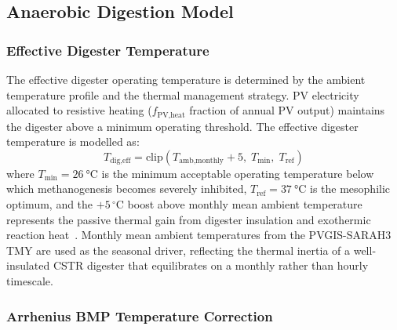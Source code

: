 \subsection{Anaerobic Digestion Model}
\label{sec:admodel}

\subsubsection{Effective Digester Temperature}

\hspace{1cm}The effective digester operating temperature is determined
by the ambient temperature profile and the thermal management strategy.
PV electricity allocated to resistive heating ($f_{\text{PV,heat}}$
fraction of annual PV output) maintains the digester above a minimum
operating threshold. The effective digester temperature is modelled as:
\begin{equation}
	T_{\text{dig,eff}} = \mathrm{clip}
	\!\left(T_{\text{amb,monthly}} + 5,\;
	T_{\text{min}},\; T_{\text{ref}}\right)
	\label{eq:tdig}
\end{equation}
where $T_{\text{min}} = \SI{26}{\celsius}$ is the minimum acceptable
operating temperature below which methanogenesis becomes severely
inhibited, $T_{\text{ref}} = \SI{37}{\celsius}$ is the mesophilic
optimum, and the $+5\,^{\circ}$C boost above monthly mean ambient
temperature represents the passive thermal gain from digester
insulation and exothermic reaction heat~\citep{lindorfer2008}.
Monthly mean ambient temperatures from the PVGIS-SARAH3 TMY are
used as the seasonal driver, reflecting the thermal inertia of a
well-insulated CSTR digester that equilibrates on a monthly rather
than hourly timescale.

\subsubsection{Arrhenius BMP Temperature Correction}

